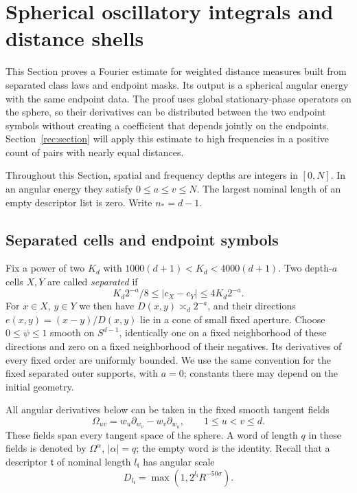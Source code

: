\section{Spherical oscillatory integrals and distance shells}
\label{osc:section}

This Section proves a Fourier estimate for weighted distance measures
built from separated class laws and endpoint masks.  Its output is a
spherical angular energy with the same endpoint data.  The proof uses
global stationary-phase operators on the sphere, so their derivatives
can be distributed between the two endpoint symbols without creating a
coefficient that depends jointly on the endpoints.  Section~\ref{rec:section}
will apply this estimate to high frequencies in a positive count of pairs
with nearly equal distances.

Throughout this Section, spatial and frequency depths are integers in
$[0,N]$.  In an angular energy they satisfy $0\le a\le v\le N$.
The largest nominal length of an empty descriptor list is zero.
Write $n_*=d-1$.

\subsection{Separated cells and endpoint symbols}

Fix a power of two $K_d$ with
$1000(d+1)<K_d<4000(d+1)$.  Two depth-$a$ cells $X,Y$ are
called \emph{separated} if
\begin{equation}\label{osc:separation}
 K_d2^{-a}/8\le |c_X-c_Y|\le 4K_d2^{-a}.
\end{equation}
For $x\in X$, $y\in Y$ we then have $D(x,y)\asymp_d2^{-a}$, and their
directions $e(x,y)=(x-y)/D(x,y)$ lie in a cone of small fixed aperture.
Choose $0\le\psi\le1$ smooth on $S^{d-1}$, identically one on a fixed
neighborhood of these directions and zero on a fixed neighborhood of
their negatives.  Its derivatives of every fixed order are uniformly
bounded.  We use the same convention for the fixed separated outer
supports, with $a=0$; constants there may depend on the initial geometry.

All angular derivatives below can be taken in the fixed smooth tangent
fields
\[
 \Omega_{uv}=w_u\partial_{w_v}-w_v\partial_{w_u},
 \qquad 1\le u<v\le d.
\]
These fields span every tangent space of the sphere.  A word of length
$q$ in these fields is denoted by $\Omega^\alpha$, $|\alpha|=q$; the empty
word is the identity.  Recall that a descriptor $\mathfrak t$ of nominal
length $l_{\mathfrak t}$ has angular scale
\[
 D_{l_{\mathfrak t}}=\max(1,2^{l_{\mathfrak t}}R^{-50\sigma}).
\]

